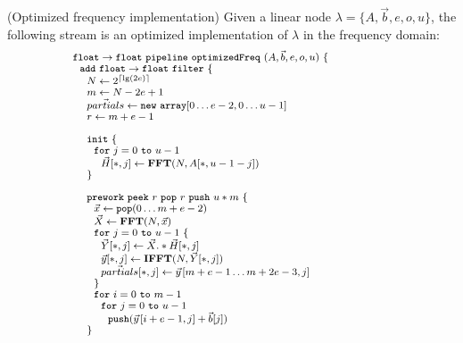 \begin{transformation}
(Optimized frequency implementation)
Given a linear node $\lambda = \{A, {\vec b}, e, o, u\}$, the
following stream is an optimized implementation of $\lambda$ in the
frequency domain:
\begin{equation} \nonumber
{\small
  \begin{array}{ll}
    {\tt float \rightarrow float}~{\tt pipeline~optimizedFreq~}(A, {\vec b}, e, o, u){\tt ~\{} & \hspace{40pt}\\
    ~~{\tt add~float \rightarrow float~filter~\{}\\
    ~~~~N \leftarrow 2^{\lceil \lg(2e) \rceil} \\
    ~~~~m \leftarrow N-2e+1 \\
    ~~~~\vec{partials} \leftarrow {\tt new~array}[0 \dots e-2, 0\dots u-1] \\
    ~~~~r \leftarrow m+e-1 \\
    \\
    ~~~~{\tt init}~{\tt \{} \\
    ~~~~~~{\tt for}~j=0~{\tt to}~u-1\\
    ~~~~~~~~\vec{H}[*,j] \leftarrow \mathbf{FFT}(N,A[*,u-1-j]) \\
    ~~~~{\tt \}} \\
    \\
    ~~~~{\tt prework}~{\tt peek}~r~{\tt pop}~r~{\tt push}~u*m~{\tt \{}\\
    ~~~~~~\vec{x} \leftarrow {\tt pop}(0 \dots m+e-2) \\
    ~~~~~~\vec{X} \leftarrow \mathbf{FFT} (N, \vec{x}) \\
    ~~~~~~{\tt for}~j=0~{\tt to}~u-1~{\tt \{}\\
    ~~~~~~~~\vec{Y}[*,j] \leftarrow \vec{X} .* \vec{H}[*,j] \\
    ~~~~~~~~\vec{y}[*,j] \leftarrow \mathbf{IFFT}(N, \vec{Y}[*,j]) \\
    ~~~~~~~~\vec{partials}[*,j] \leftarrow \vec{y}\hspace{1pt}[m+e-1 \dots m+2e-3,j] \\
    ~~~~~~{\tt \}} \\
    ~~~~~~{\tt for}~i=0~{\tt to}~m-1\\
    ~~~~~~~~{\tt for}~j=0~{\tt to}~u-1\\
    ~~~~~~~~~~{\tt push}(\vec{y}\hspace{1pt}[i+e-1,j] + \vec{b}[j]) \\
    ~~~~{\tt \}} \\

\end{array}}
\end{equation}
\end{transformation}

